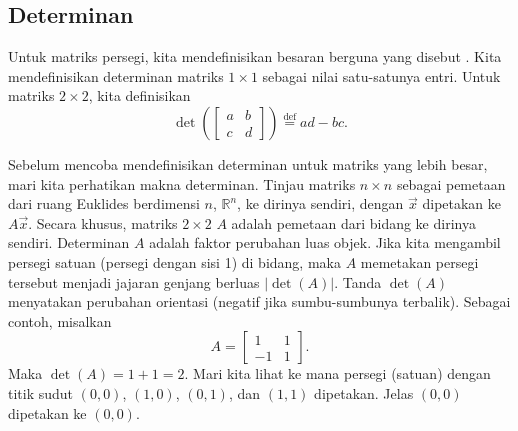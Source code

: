\subsection{Determinan}

Untuk matriks persegi, kita mendefinisikan besaran berguna yang disebut
\emph{}.  Kita mendefinisikan
determinan matriks $1 \times 1$ sebagai nilai satu-satunya entri.
Untuk matriks $2 \times 2$, kita definisikan
\begin{equation*}
\det \left(
\begin{bmatrix}
a & b \\
c & d
\end{bmatrix}
\right)
\overset{\text{def}}{=}
ad-bc .
\end{equation*}

Sebelum mencoba mendefinisikan
determinan untuk matriks yang lebih besar, mari kita perhatikan
makna determinan.  Tinjau matriks $n \times n$
sebagai pemetaan dari ruang Euklides berdimensi $n$, ${\mathbb{R}}^n$, ke
dirinya sendiri, dengan $\vec{x}$ dipetakan ke $A \vec{x}$.
Secara khusus, matriks $2 \times 2$ $A$ adalah pemetaan dari
bidang ke dirinya sendiri.  Determinan
$A$ adalah faktor perubahan luas objek.
Jika kita mengambil persegi satuan (persegi dengan sisi 1) di bidang, maka
$A$ memetakan persegi tersebut menjadi jajaran genjang berluas $\lvert\det(A)\rvert$.  Tanda
$\det(A)$ menyatakan perubahan orientasi (negatif jika sumbu-sumbunya terbalik).  Sebagai
contoh, misalkan
\begin{equation*}
A =
\begin{bmatrix}
1 & 1 \\
-1 & 1
\end{bmatrix} .
\end{equation*}
Maka $\det(A) = 1+1 = 2$.  Mari kita lihat ke mana persegi (satuan) dengan titik sudut
$(0,0)$, $(1,0)$, $(0,1)$, dan $(1,1)$ dipetakan.  Jelas $(0,0)$ dipetakan
ke $(0,0)$.
